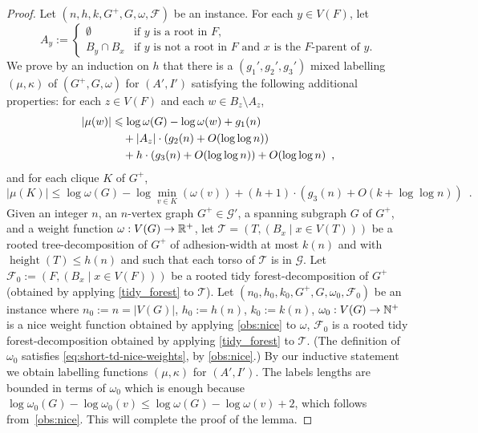 \documentclass{patmorin}
\let\eqref\cref
\renewcommand{\le}{\leqslant}
\renewcommand{\leq}{\leqslant}
\DeclareMathOperator{\height}{height}
\newcommand{\Oh}{O}
\newcommand{\calF}{\mathcal{F}}
\newcommand{\calG}{\mathcal{G}}
\newcommand{\calT}{\mathcal{T}}
\begin{document}
\begin{proof}
  Let $(n,h,k,G^+,G,\omega,\calF)$ be an instance.
  For each $y\in V(F)$, let
  \[
    A_y:=\begin{cases}
      \emptyset   & \textrm{if $y$ is a root in $F$,}                                      \\
      B_y\cap B_x & \textrm{if $y$ is not a root in $F$ and $x$ is the $F$-parent of $y$.}
    \end{cases}
  \]
  We prove by an induction on $h$ that there is a $(g_1',g_2',g_3')$ mixed labelling $(\mu,\kappa)$ of $(G^+,G,\omega)$ for $(A',I')$ satisfying the following additional properties: for each $z\in V(F)$ and each $w\in B_z\setminus A_z$,
  \begin{align}
    |\mu(w)|
     & \le \log \omega(G) - \log \omega(w) + g_1(n)\notag                           \\
     & \quad {} + |A_z|\cdot (g_2(n) + \Oh(\log\log n))\label{strong_strong}        \\
     & \quad {} + h\cdot(g_3(n) + \Oh(\log\log n)) + \Oh(\log\log n)\enspace,\notag
  \end{align}
  and for each clique $K$ of $G^+$,
  \begin{equation}
    |\mu(K)| \le \log\omega(G) - \log\min_{v\in K}(\omega(v)) + (h+1)\cdot(g_3(n) + \Oh(k+\log\log n))\enspace.\label{strong_clique}
  \end{equation}
  Given an integer $n$, an $n$-vertex graph $G^+\in\calG'$, a spanning subgraph $G$ of $G^+$, and a weight function $\omega:V(G)\to\mathbb{R}^+$, let $\calT=(T,(B_x \mid x\in V(T)))$ be a rooted tree-decomposition of $G^+$ of adhesion-width at most $k(n)$ and with $\height(T)\leq h(n)$ and such that each torso of $\calT$ is in $\calG$. Let $\calF_0:=(F,(B_x \mid x\in V(F)))$ be a rooted tidy forest-decomposition of $G^+$ (obtained by applying \cref{tidy_forest} to $\calT$).  Let $(n_0,h_0,k_0,G^+,G,\omega_0,\calF_0)$ be an instance where $n_0:=n=|V(G)|$, $h_0:=h(n)$, $k_0:=k(n)$, $\omega_0:V(G)\to\mathbb{N}^+$ is a nice weight function obtained by applying \cref{obs:nice} to $\omega$, $\calF_0$ is a rooted tidy forest-decomposition obtained by applying \cref{tidy_forest} to $\calT$.  (The definition of $\omega_0$ satisfies \eqref{eq:short-td-nice-weights}, by \cref{obs:nice}.)
  By our inductive statement we obtain labelling functions $(\mu,\kappa)$ for $(A',I')$.
  The labels lengths are bounded in terms of $\omega_0$ which is enough because $\log\omega_0(G) - \log\omega_0(v) \leq \log\omega(G)-\log\omega(v)+2$, which follows from~\cref{obs:nice}.
  This will complete the proof of the lemma.


\end{proof}
\end{document}
